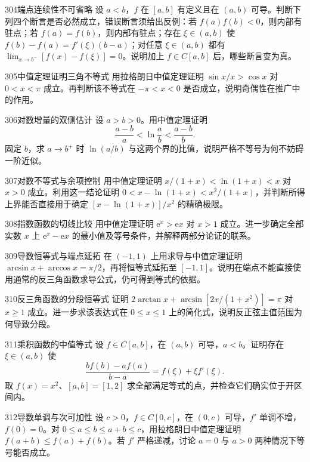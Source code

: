 \begin{exercise}{304}{端点连续性不可省略}
设 $a<b$，$f$ 在 $[a,b]$ 有定义且在 $(a,b)$ 可导。判断下列四个断言是否必然成立，错误断言须给出反例：若 $f(a)f(b)<0$，则内部有驻点；若 $f(a)=f(b)$，则内部有驻点；存在 $\xi\in(a,b)$ 使 $f(b)-f(a)=f'(\xi)(b-a)$；对任意 $\xi\in(a,b)$ 都有 $\lim_{x\to b^-}[f(x)-f(\xi)]=0$。说明加上 $f\in C[a,b]$ 后，哪些断言变为真。
\end{exercise}
\begin{exercise}{305}{中值定理证明三角不等式}
用拉格朗日中值定理证明 $\sin x/x>\cos x$ 对 $0<x<\pi$ 成立。再判断该不等式在 $-\pi<x<0$ 是否成立，说明奇偶性在推广中的作用。
\end{exercise}
\begin{exercise}{306}{对数增量的双侧估计}
设 $a>b>0$。用中值定理证明
\[\frac{a-b}{a}<\ln\frac ab<\frac{a-b}{b}.\]
固定 $b$，求 $a\to b^+$ 时 $\ln(a/b)$ 与这两个界的比值，说明严格不等号为何不妨碍一阶近似。
\end{exercise}
\begin{exercise}{307}{对数不等式与余项控制}
用中值定理证明 $x/(1+x)<\ln(1+x)<x$ 对 $x>0$ 成立。利用这一结论证明 $0<x-\ln(1+x)<x^2/(1+x)$，并判断所得上界能否直接用于确定 $[x-\ln(1+x)]/x^2$ 的精确极限。
\end{exercise}
\begin{exercise}{308}{指数函数的切线比较}
用中值定理证明 $\mathrm e^x>\mathrm e x$ 对 $x>1$ 成立。进一步确定全部实数 $x$ 上 $\mathrm e^x-\mathrm e x$ 的最小值及等号条件，并解释两部分论证的联系。
\end{exercise}
\begin{exercise}{309}{导数恒等式与端点延拓}
在 $(-1,1)$ 上用求导与中值定理证明 $\arcsin x+\arccos x=\pi/2$，再将恒等式延拓至 $[-1,1]$。说明在端点不能直接使用通常的反三角函数求导公式，仍可得到等式的依据。
\end{exercise}
\begin{exercise}{310}{反三角函数的分段恒等式}
证明 $2\arctan x+\arcsin[2x/(1+x^2)]=\pi$ 对 $x\ge1$ 成立。进一步求该表达式在 $0\le x\le1$ 上的简化式，说明反正弦主值范围为何导致分段。
\end{exercise}
\begin{exercise}{311}{乘积函数的中值等式}
设 $f\in C[a,b]$，在 $(a,b)$ 可导，$a<b$。证明存在 $\xi\in(a,b)$ 使
\[\frac{bf(b)-af(a)}{b-a}=f(\xi)+\xi f'(\xi).\]
取 $f(x)=x^2$、$[a,b]=[1,2]$ 求全部满足等式的点，并检查它们确实位于开区间内。
\end{exercise}
\begin{exercise}{312}{导数单调与次可加性}
设 $c>0$，$f\in C[0,c]$，在 $(0,c)$ 可导，$f'$ 单调不增，$f(0)=0$。对 $0\le a\le b\le a+b\le c$，用拉格朗日中值定理证明 $f(a+b)\le f(a)+f(b)$。若 $f'$ 严格递减，讨论 $a=0$ 与 $a>0$ 两种情况下等号能否成立。
\end{exercise}
